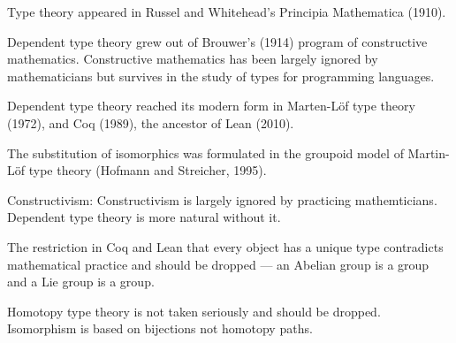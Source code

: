 
Type theory appeared in Russel and Whitehead's Principia Mathematica (1910).

\vfill
Dependent type theory grew out of Brouwer's (1914) program of constructive mathematics.
Constructive mathematics has been largely ignored by mathematicians
but survives in the study of types for programming languages.

\vfill
Dependent type theory reached its modern form in Marten-L\"{o}f type theory (1972),
and Coq (1989), the ancestor of Lean (2010).

\vfill
The substitution of isomorphics was formulated in the groupoid model of Martin-L\"{o}f type theory (Hofmann and Streicher, 1995).


Constructivism: Constructivism is largely ignored by practicing mathemticians. Dependent type theory is more natural without it.

\vfill
The restriction in Coq and Lean that every object has a unique type contradicts mathematical practice and should
be dropped --- an Abelian group is a group and a Lie group is a group.


\vfill
Homotopy type theory is not taken seriously and should be dropped.  Isomorphism is based on bijections not
homotopy paths.

